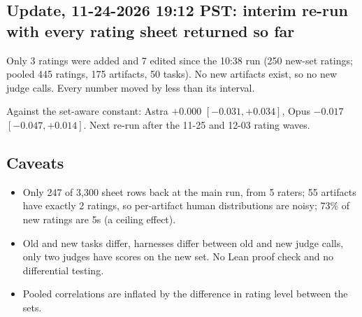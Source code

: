 \subsection*{Update, 11-24-2026 19:12 PST: interim re-run with every rating sheet returned so far}
Only 3 ratings were added and 7 edited since the 10:38 run (250 new-set ratings; pooled 445 ratings, 175 artifacts, 50 tasks).
No new artifacts exist, so no new judge calls. Every number moved by less than its interval.
\begin{center}\scriptsize\setlength{\tabcolsep}{3pt}
\end{center}
Against the set-aware constant: Astra $+0.000$ $[-0.031, +0.034]$, Opus $-0.017$ $[-0.047, +0.014]$. Next re-run after the 11-25 and 12-03
rating waves.

\subsection*{Caveats}
\begin{itemize}
  \item Only 247 of 3,300 sheet rows back at the main run, from 5 raters; 55 artifacts have exactly 2 ratings, so per-artifact human distributions are noisy; 73\% of new ratings are 5s (a ceiling effect).
  \item Old and new tasks differ, harnesses differ between old and new judge calls, only two judges have scores on the new set. No Lean proof check and no differential testing.
  \item Pooled correlations are inflated by the difference in rating level between the sets.
\end{itemize}

